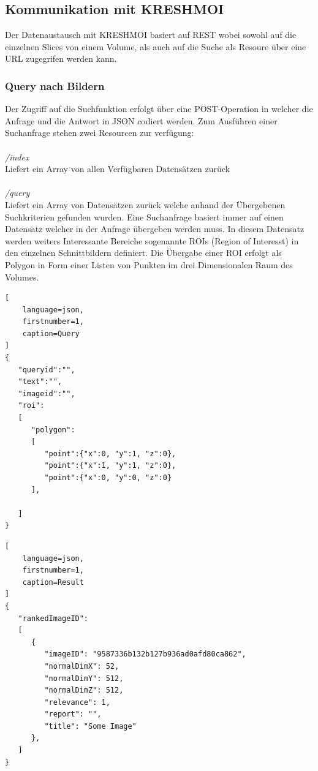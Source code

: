 \subsection{Kommunikation mit KRESHMOI}
\label{sec:Kommunikation mit KRESHMOI}
Der Datenaustausch mit KRESHMOI basiert auf REST wobei sowohl auf die einzelnen Slices von einem Volume, als auch auf die Suche als Resoure über eine URL zugegrifen werden kann.

\subsubsection{Query nach Bildern}
\label{sec:Query nach Bildern}
Der Zugriff auf die Suchfunktion erfolgt über eine POST-Operation in welcher die Anfrage und die Antwort in JSON codiert werden.
Zum Ausführen einer Suchanfrage stehen zwei Resourcen zur verfügung:
\\
\\
\textit{/index}\\
Liefert ein Array von allen Verfügbaren Datensätzen zurück 
\\
\\
\textit{/query}\\
Liefert ein Array von Datensätzen zurück welche anhand der Übergebenen Suchkriterien gefunden wurden.
Eine Suchanfrage basiert immer auf einen Datensatz welcher in der Anfrage übergeben werden muss.
In diesem Datensatz werden weiters Interessante Bereiche sogenannte ROIs (Region of Interesst) in den einzelnen Schnittbildern definiert.
Die Übergabe einer ROI erfolgt als Polygon in Form einer Listen von Punkten im drei Dimensionalen Raum des Volumes.
\begin{lstlisting}[
	language=json,
	firstnumber=1,
	caption=Query
]
{
   "queryid":"",
   "text":"",
   "imageid":"",
   "roi": 
   [
      "polygon":
      [
         "point":{"x":0, "y":1, "z":0},
         "point":{"x":1, "y":1, "z":0},
         "point":{"x":0, "y":0, "z":0}
      ],

   ]
}
\end{lstlisting}


\begin{lstlisting}[
	language=json,
	firstnumber=1,
	caption=Result
]
{
   "rankedImageID": 
   [
      {
         "imageID": "9587336b132b127b936ad0afd80ca862",
         "normalDimX": 52,
         "normalDimY": 512,
         "normalDimZ": 512,
         "relevance": 1,
         "report": "",
         "title": "Some Image"
      },
   ]
}
\end{lstlisting}

